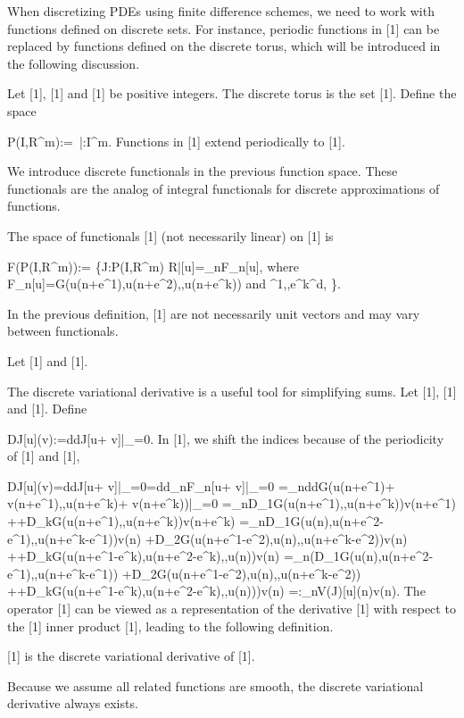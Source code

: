 \documentclass{article}
\begin{document}
{When discretizing PDEs using finite difference schemes, we need to work with functions defined on discrete sets. For instance, periodic functions in [1] can be replaced by functions defined on the discrete torus, which will be introduced in the following discussion.

	
	Let [1], [1] and [1] be positive integers. The {discrete torus} is the set [1]. Define the space
	
		{P}({I},{R}^m):=\ |:{I}^m.
Functions in [1] extend periodically to [1].

We introduce discrete functionals in the previous function space. These functionals are the analog of integral functionals for discrete approximations of functions.

	
	The space of functionals [1] (not necessarily linear) on [1] is
	
		{F}({P}({I},{R}^m)):= \{{J}:{P}({I},{R}^m) {R}\Bigg|[u]=_{n}F_n[u],
		{ where }
		F_n[u]=G(u(n+e^1),u(n+e^2),,u(n+e^k))
		{ and }^1,,e^k^d,
		\}.

In the previous definition, [1] are not necessarily unit vectors and may vary between functionals.

	
	Let [1] and
	[1].

The discrete variational derivative is a useful tool for simplifying sums.
Let [1], [1] and [1]. Define

	D{J}[u](v):={d}{d}{J}[u+ v]|_{=0}.
In [1], we shift the indices because of the periodicity of [1] and [1],

		D{J}[u](v)={d}{d}{J}[u+ v]|_{=0}={d}{d}_{n}F_n[u+ v]|_{=0}
		=_{n}{d}{d}G(u(n+e^1)+ v(n+e^1),,u(n+e^k)+ v(n+e^k))|_{=0}
		=_{n}D_1G(u(n+e^1),,u(n+e^k))v(n+e^1)
		++D_kG(u(n+e^1),,u(n+e^k))v(n+e^k)
		=_{n}D_1G(u(n),u(n+e^2-e^1),,u(n+e^k-e^1))v(n)
		+D_2G(u(n+e^1-e^2),u(n),,u(n+e^k-e^2))v(n)
		++D_kG(u(n+e^1-e^k),u(n+e^2-e^k),,u(n))v(n)
		=_{n}(D_1G(u(n),u(n+e^2-e^1),,u(n+e^k-e^1))
		+D_2G(u(n+e^1-e^2),u(n),,u(n+e^k-e^2))
		++D_kG(u(n+e^1-e^k),u(n+e^2-e^k),,u(n)))v(n)
		=:_{n}{V}({J})[u](n)v(n).
The operator [1] can be viewed as a representation of the derivative [1] with respect to the [1] inner product [1], leading to the following definition.

	[1] is the {discrete variational derivative} of [1].

Because we assume all related functions are smooth, the discrete variational derivative always exists.

}
\end{document}
